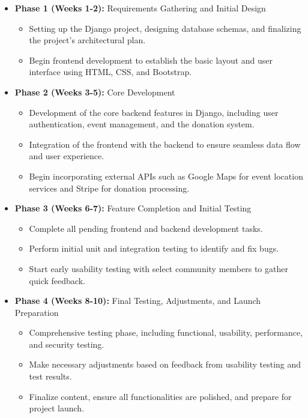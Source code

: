 \begin{itemize}
    \item \textbf{Phase 1 (Weeks 1-2):} Requirements Gathering and Initial Design
    \begin{itemize}
        \item Setting up the Django project, designing database schemas, and finalizing the project's architectural plan.
        \item Begin frontend development to establish the basic layout and user interface using HTML, CSS, and Bootstrap.
    \end{itemize}

    \item \textbf{Phase 2 (Weeks 3-5):} Core Development
    \begin{itemize}
        \item Development of the core backend features in Django, including user authentication, event management, and the donation system.
        \item Integration of the frontend with the backend to ensure seamless data flow and user experience.
        \item Begin incorporating external APIs such as Google Maps for event location services and Stripe for donation processing.
    \end{itemize}

    \item \textbf{Phase 3 (Weeks 6-7):} Feature Completion and Initial Testing
    \begin{itemize}
        \item Complete all pending frontend and backend development tasks.
        \item Perform initial unit and integration testing to identify and fix bugs.
        \item Start early usability testing with select community members to gather quick feedback.
    \end{itemize}

    \item \textbf{Phase 4 (Weeks 8-10):} Final Testing, Adjustments, and Launch Preparation
    \begin{itemize}
        \item Comprehensive testing phase, including functional, usability, performance, and security testing.
        \item Make necessary adjustments based on feedback from usability testing and test results.
        \item Finalize content, ensure all functionalities are polished, and prepare for project launch.
    \end{itemize}
\end{itemize}

